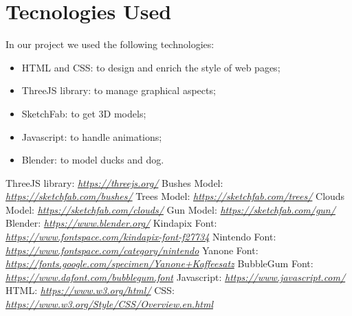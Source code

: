 \documentclass[12pt,a4paper]{article}
\begin{document}
	\section*{Tecnologies Used}
	In our project we used the following technologies:
	\begin{itemize}
		\item HTML and CSS: to design and enrich the style of web pages; 
		\item ThreeJS library: to manage graphical aspects;
		\item SketchFab: to get 3D models;
		\item Javascript: to handle animations;
		\item Blender: to model ducks and dog.
	\end{itemize}
	\begin{thebibliography}{9} 
		\bibitem{} ThreeJS library:
		\emph{\href{https://threejs.org/}{https://threejs.org/}}
		\bibitem{} Bushes Model:
		\emph{\href{https://sketchfab.com/3d-models/set-5-008-dd7452ff968243069124bacfc96fc997}{https://sketchfab.com/bushes/}}
		\bibitem{} Trees Model:
		\emph{\href{https://sketchfab.com/3d-models/low-poly-oak-tree-02-909de376b61d4a2fb073e195fb719619}{https://sketchfab.com/trees/}}
		\bibitem{} Clouds Model:
		\emph{\href{https://sketchfab.com/3d-models/cloud-3-f64f44d1b99545c681ff5965d3268d32}{https://sketchfab.com/clouds/}}
		\bibitem{} Gun Model:
		\emph{\href{https://sketchfab.com/3d-models/shotgun-acacf7f5a1a34b3b9fbe3c6d283a4fc8}{https://sketchfab.com/gun/}}
		\bibitem{} Blender:
		\emph{\href{https://www.blender.org/}{https://www.blender.org/}}
		\bibitem{} Kindapix Font:
		\emph{\href{https://www.fontspace.com/kindapix-font-f27734}{https://www.fontspace.com/kindapix-font-f27734}}
		\bibitem{} Nintendo Font:
		\emph{\href{https://www.fontspace.com/category/nintendo}{https://www.fontspace.com/category/nintendo}}
		\bibitem{} Yanone Font:
		\emph{\href{https://fonts.google.com/specimen/Yanone+Kaffeesatz}{https://fonts.google.com/specimen/Yanone+Kaffeesatz}}
		\bibitem{} BubbleGum Font:
		\emph{\href{https://www.dafont.com/bubblegum.font}{https://www.dafont.com/bubblegum.font}}
		\bibitem{} Javascript:
		\emph{\href{https://www.javascript.com/}{https://www.javascript.com/}}
		\bibitem{} HTML:
		\emph{\href{https://www.w3.org/html/}{https://www.w3.org/html/}}
		\bibitem{} CSS:
		\emph{\href{https://www.w3.org/Style/CSS/Overview.en.html}{https://www.w3.org/Style/CSS/Overview.en.html}}
	\end{thebibliography}

	
	
\end{document}
